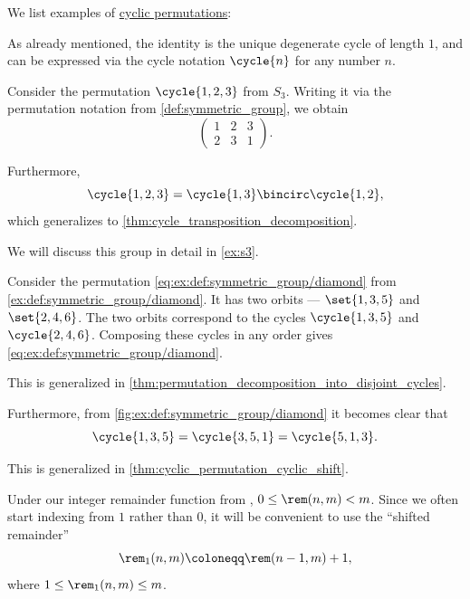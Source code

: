 \begin{example}\label{ex:def:cyclic_permutation}
  We list examples of \hyperref[def:cyclic_permutation]{cyclic permutations}:
  \begin{thmenum}
     As already mentioned, the identity is the unique degenerate cycle of length \( 1 \), and can be expressed via the cycle notation \( \cycle{ n } \) for any number \( n \).

     Consider the permutation \( \cycle{ 1, 2, 3 } \) from \( S_3 \). Writing it via the permutation notation from \cref{def:symmetric_group}, we obtain
    \begin{equation*}
      \begin{pmatrix}
        1 & 2 & 3 \\
        2 & 3 & 1
      \end{pmatrix}.
    \end{equation*}

    Furthermore,
    \begin{equation*}
      \cycle{ 1, 2, 3 } = \cycle{ 1, 3 } \bincirc \cycle{ 1, 2 },
    \end{equation*}
    which generalizes to \cref{thm:cycle_transposition_decomposition}.

    We will discuss this group in detail in \cref{ex:s3}.

     Consider the permutation \eqref{eq:ex:def:symmetric_group/diamond} from \cref{ex:def:symmetric_group/diamond}. It has two orbits --- \( \set{ 1, 3, 5 } \) and \( \set{ 2, 4, 6 } \). The two orbits correspond to the cycles \( \cycle{ 1, 3, 5 } \) and \( \cycle{ 2, 4, 6 } \). Composing these cycles in any order gives \eqref{eq:ex:def:symmetric_group/diamond}.

    This is generalized in \cref{thm:permutation_decomposition_into_disjoint_cycles}.

    Furthermore, from \cref{fig:ex:def:symmetric_group/diamond} it becomes clear that
    \begin{equation*}
      \cycle{ 1, 3, 5 } = \cycle{ 3, 5, 1 } = \cycle{ 5, 1, 3 }.
    \end{equation*}

    This is generalized in \cref{thm:cyclic_permutation_cyclic_shift}.
  \end{thmenum}
\end{example}

\begin{definition}\label{def:shifted_remainder}\mimprovised
  Under our integer remainder function from , \( 0 \leq \rem(n, m) < m \). Since we often start indexing from \( 1 \) rather than \( 0 \), it will be convenient to use the \enquote{shifted remainder}
  \begin{equation}\label{eq:def:shifted_remainder}
    \rem_1(n, m) \coloneqq \rem(n - 1, m) + 1,
  \end{equation}
  where \( 1 \leq \rem_1(n, m) \leq m \).
\end{definition}

